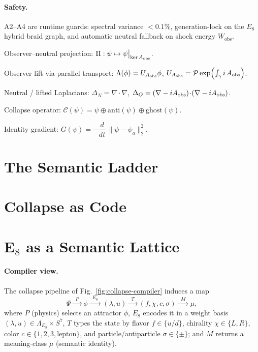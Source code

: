 \paragraph{Safety.}
A2–A4 are runtime guards: spectral variance $<0.1\%$, generation-lock on the $E_8$ hybrid
braid graph, and automatic neutral fallback on shock energy $W_{\text{obs}}$.

\begin{tcolorbox}[title=Notation (Semantic Universe), colback=white, colframe=black!15]
\begin{description}[leftmargin=1.6em, labelsep=0.6em]
  \item[$\Pi$] Observer–neutral projection:
    $\Pi:\psi\mapsto \psi\big|_{\ker A_{\rm obs}}$.
  \item[$\Lambda$] Observer lift via parallel transport:
    $\Lambda(\phi)=U_{A_{\rm obs}}\phi$, \quad
    $U_{A_{\rm obs}}= \mathcal{P}\exp\!\left(\int_\gamma i\,A_{\rm obs}\right)$.
  \item[$\Delta_N,\Delta_O$] Neutral / lifted Laplacians:
    $\Delta_N=\nabla\!\cdot\!\nabla$, \;
    $\Delta_O=(\nabla - iA_{\rm obs})\!\cdot\!(\nabla - iA_{\rm obs})$.
  \item[$\mathcal{C}(\psi)$] Collapse operator:
    $\mathcal{C}(\psi)=\psi\oplus\mathrm{anti}(\psi)\oplus\mathrm{ghost}(\psi)$.
  \item[$G(\psi)$] Identity gradient:
    $G(\psi)=-\dfrac{d}{dt}\,\|\psi-\psi_a\|_2^2$.
\end{description}
\end{tcolorbox}

\section{The Semantic Ladder}


\section{Collapse as Code}


\section{E\texorpdfstring{$_8$}{8} as a Semantic Lattice}
\label{sec:e8-sem-lattice}

\paragraph{Compiler view.}
The collapse pipeline of Fig.~\ref{fig:collapse-compiler} induces a map
\[
  \Psi \xrightarrow{\;\;P\;\;} \phi
  \xrightarrow{\;\;E_8\;\;} (\lambda,u)
  \xrightarrow{\;\;T\;\;} (f,\chi,c,\sigma)
  \xrightarrow{\;\;M\;\;} \mu ,
\]
where \(P\) (physics) selects an attractor \(\phi\), \(E_8\) encodes it in a weight basis
\((\lambda,u)\in \Lambda_{E_8}\times S^7\), \(T\) types the state by
flavor \(f\in\{u/d\}\), chirality \(\chi\in\{L,R\}\), color
\(c\in\{1,2,3,\text{lepton}\}\), and particle/antiparticle
\(\sigma\in\{\pm\}\); and \(M\) returns a meaning‐class \(\mu\) (semantic identity).

